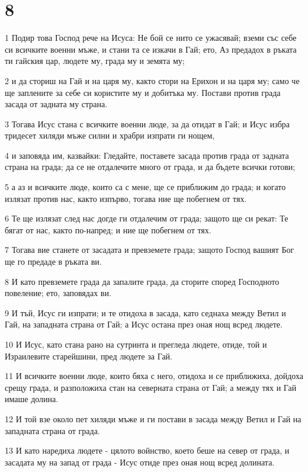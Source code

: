 \chapter{8}

\par 1 Подир това Господ рече на Исуса: Не бой се нито се ужасявай; вземи със себе си всичките военни мъже, и стани та се изкачи в Гай; ето, Аз предадох в ръката ти гайския цар, людете му, града му и земята му;
\par 2 и да сториш на Гай и на царя му, както стори на Ерихон и на царя му; само че ще заплените за себе си користите му и добитъка му. Постави против града засада от задната му страна.
\par 3 Тогава Исус стана с всичките военни люде, за да отидат в Гай; и Исус избра тридесет хиляди мъже силни и храбри изпрати ги нощем,
\par 4 и заповяда им, казвайки: Гледайте, поставете засада против града от задната страна на града; да се не отдалечите много от града, и да бъдете всички готови;
\par 5 а аз и всичките люде, които са с мене, ще се приближим до града; и когато излязат против нас, както изпърво, тогава ние ще побегнем от тях.
\par 6 Те ще излязат след нас догде ги отдалечим от града; защото ще си рекат: Те бягат от нас, както по-напред; и ние ще побегнем от тях.
\par 7 Тогава вие станете от засадата и превземете града; защото Господ вашият Бог ще го предаде в ръката ви.
\par 8 И като превземете града да запалите града, да сторите според Господното повеление; ето, заповядах ви.
\par 9 И тъй, Исус ги изпрати; и те отидоха в засада, като седнаха между Ветил и Гай, на западната страна от Гай; а Исус остана през оная нощ всред людете.
\par 10 И Исус, като стана рано на сутринта и прегледа людете, отиде, той и Израилевите старейшини, пред людете за Гай.
\par 11 И всичките военни люде, които бяха с него, отидоха и се приближиха, дойдоха срещу града, и разположиха стан на северната страна от Гай; а между тях и Гай имаше долина.
\par 12 И той взе около пет хиляди мъже и ги постави в засада между Ветил и Гай на западната страна от града.
\par 13 И като наредиха людете - цялото войнство, което беше на север от града, и засадата му на запад от града - Исус отиде през оная нощ всред долината.
